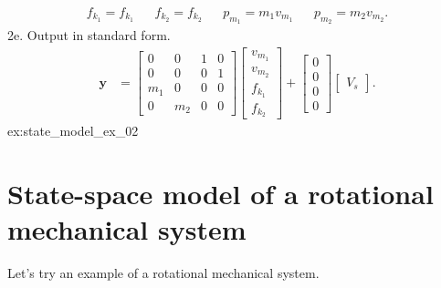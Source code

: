\documentclass[dynamic_systems.tex]{subfiles}
\begin{document}
{\begin{align*}
	f_{k_1} = f_{k_1} && f_{k_2} = f_{k_2} &&
	p_{m_1} = m_1 v_{m_1} && p_{m_2} = m_2 v_{m_2}.
\end{align*}
\bigskip
2e. Output in standard form.
\begin{align*}
	\bm{y} &=
	\begin{bmatrix}
		0 & 0 & 1 & 0 \\
		0 & 0 & 0 & 1 \\
		m_1 & 0 & 0 & 0 \\
		0 & m_2 & 0 & 0
	\end{bmatrix}
	\begin{bmatrix}
		v_{m_1}\\v_{m_2}\\f_{k_1}\\f_{k_2}
	\end{bmatrix}
	+
	\begin{bmatrix}
		0 \\ 0 \\ 0 \\ 0
	\end{bmatrix}
	\begin{bmatrix}
		V_s
	\end{bmatrix}.
\end{align*}
}{%
ex:state_model_ex_02%
}

\section{State-space model of a rotational mechanical system}
\tags{}

Let's try an example of a rotational mechanical system.
\end{document}
